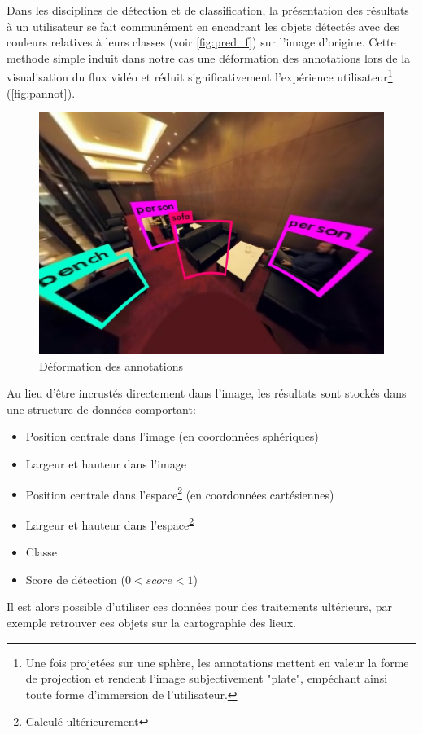 			\par
			Dans les disciplines de détection et de classification, la présentation des résultats à un utilisateur se fait communément en encadrant les objets détectés avec des couleurs relatives à leurs classes (voir \autoref{fig:pred_f}) sur l'image d'origine. Cette methode simple induit dans notre cas une déformation des annotations lors de la visualisation du flux vidéo et réduit significativement l'expérience utilisateur\footnote{Une fois projetées sur une sphère, les annotations mettent en valeur la forme de projection et rendent l'image subjectivement "plate", empéchant ainsi toute forme d'immersion de l'utilisateur.} (\autoref{fig:pannot}).
			\begin{figure}[H]
			{
				\centering
				\includegraphics[width=.8\textwidth]{figures/pannot.png}
				\caption{Déformation des annotations}
				\label{fig:pannot}
			}
			\end{figure}
			Au lieu d'être incrustés directement dans l'image, les résultats sont stockés dans une structure de données comportant:
			\begin{itemize}[noitemsep]
				\item Position centrale dans l'image (en coordonnées sphériques)
				\item Largeur et hauteur dans l'image
				\item Position centrale dans l'espace\footnote{\label{ft_calc} Calculé ultérieurement} (en coordonnées cartésiennes)
				\item Largeur et hauteur dans l'espace\textsuperscript{\ref{ft_calc}}
				\item Classe
				\item Score de détection ($ 0 < score < 1 $)
			\end{itemize}
			Il est alors possible d'utiliser ces données pour des traitements ultérieurs, par exemple retrouver ces objets sur la cartographie des lieux.
		
